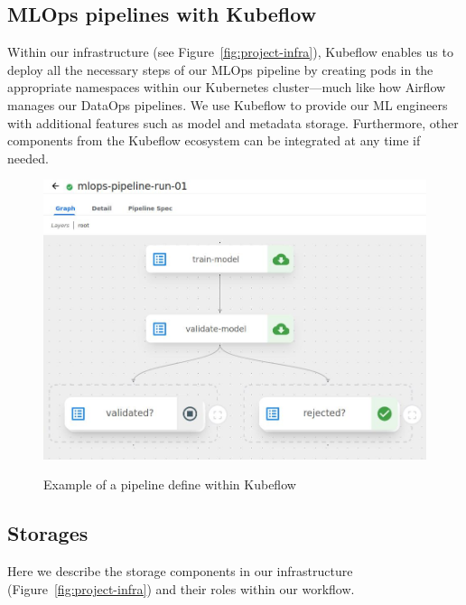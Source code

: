 \subsection{MLOps pipelines with Kubeflow}\label{subsec:mlops-pipelines2}
Within our infrastructure (see Figure~\ref{fig:project-infra}), Kubeflow enables us to deploy all the necessary steps of our MLOps pipeline by creating pods in the appropriate namespaces within our Kubernetes cluster—much like how Airflow manages our DataOps pipelines.
We use Kubeflow to provide our ML engineers with additional features such as model and metadata storage.
Furthermore, other components from the Kubeflow ecosystem can be integrated at any time if needed.

\begin{figure}[!htbp]
    \centering
    \caption{Example of a pipeline define within Kubeflow}
    \includegraphics[scale=0.3]{images/project/mlops-workflow-kubeflow}
    \label{fig:project-ml-ops-airflow-dag}
\end{figure}

\subsection{Storages}\label{subsec:storage}
Here we describe the storage components in our infrastructure (Figure~\ref{fig:project-infra}) and their roles within our workflow.


